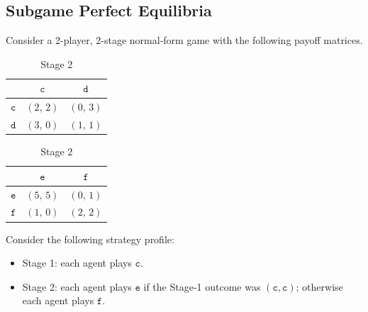 \clearpage

\subsection{\points[12] Subgame Perfect Equilibria}

Consider a 2-player, 2-stage normal-form game with the following payoff matrices.

\begin{table}[H]
\begin{minipage}{.5\linewidth}
\centering
\begin{tabular}{|c|c|c|}
\hline
             & $\texttt{c}$       & $\texttt{d}$       \\\hline
$\texttt{c}$ & $(2,\,2)$ & $(0,\,3)$ \\\hline
$\texttt{d}$ & $(3,\,0)$ & $(1,\,1)$ \\\hline
\end{tabular}
\caption*{Stage 1}
\end{minipage}%
\begin{minipage}{.5\linewidth}
\centering
\begin{tabular}{|c|c|c|}
\hline
             & $\texttt{e}$       & $\texttt{f}$       \\\hline
$\texttt{e}$ & $(5,\,5)$ & $(0,\,1)$ \\\hline
$\texttt{f}$ & $(1,\,0)$ & $(2,\,2)$ \\\hline
\end{tabular}
\caption*{Stage 2}
\end{minipage}
\end{table}

\noindent Consider the following strategy profile:
\begin{itemize}
  \item Stage 1: each agent plays $\texttt{c}$.
  \item Stage 2: each agent plays $\texttt{e}$ if the Stage-1 outcome was
        $(\texttt{c},\texttt{c})$; otherwise each agent plays $\texttt{f}$.
\end{itemize}

